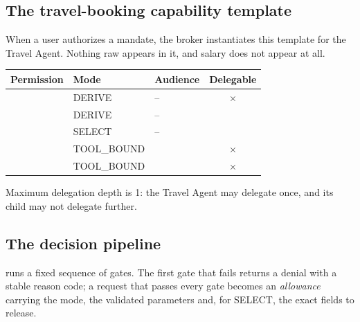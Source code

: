 \documentclass[11pt,a4paper]{article}
\newcommand{\yes}{{\color{ok}\checkmark}}
\newcommand{\no}{{\color{deny}$\times$}}
\begin{document}
\subsection{The travel-booking capability template}
When a user authorizes a  mandate, the broker instantiates this template for the Travel Agent. Nothing raw appears in it, and salary does not appear at all.

\begin{center}
\renewcommand{\arraystretch}{1.3}
\small
\begin{tabularx}{\textwidth}{@{}Y l l c@{}}
\toprule
\textbf{Permission} & \textbf{Mode} & \textbf{Audience} & \textbf{Delegable}\\
\midrule
{} & DERIVE & -- & \no\\
 & DERIVE & -- & \yes\\
 & SELECT & -- & \yes\\
 & TOOL\_BOUND &  & \no\\
 & TOOL\_BOUND &  & \no\\
\bottomrule
\end{tabularx}
\end{center}
Maximum delegation depth is 1: the Travel Agent may delegate once, and its child may not delegate further.

\subsection{The decision pipeline}
 runs a fixed sequence of gates. The first gate that fails returns a denial with a stable reason code; a request that passes every gate becomes an \emph{allowance} carrying the mode, the validated parameters and, for SELECT, the exact fields to release.
\end{document}
